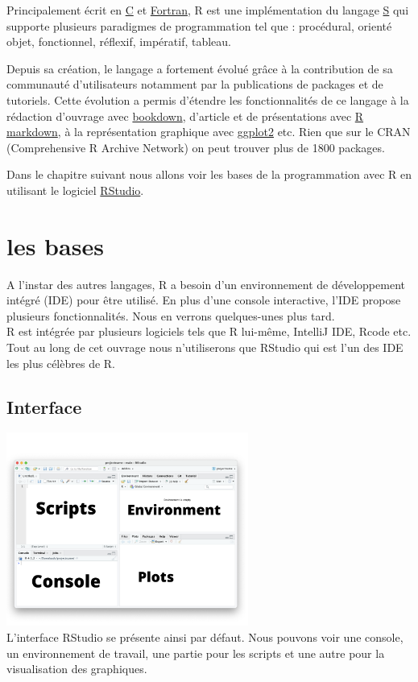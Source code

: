 \documentclass[
]{book}
\theoremstyle{definition}
\theoremstyle{definition}
\theoremstyle{definition}
\theoremstyle{definition}
\theoremstyle{remark}
\begin{document}
Principalement écrit en \href{https://en.wikipedia.org/wiki/C_(programming_language)}{C} et \href{https://en.wikipedia.org/wiki/Fortran}{Fortran}, R est une implémentation du langage \href{https://en.wikipedia.org/wiki/S_(programming_language)}{S} qui supporte plusieurs paradigmes de programmation tel que : procédural, orienté objet, fonctionnel, réflexif, impératif, tableau.

Depuis sa création, le langage a fortement évolué grâce à la contribution de sa communauté d'utilisateurs notamment par la publications de packages et de tutoriels. Cette évolution a permis d'étendre les fonctionnalités de ce langage à la rédaction d'ouvrage avec \href{https://bookdown.org/}{bookdown}, d'article et de présentations avec \href{https://rmarkdown.rstudio.com/}{R markdown}, à la représentation graphique avec \href{https://ggplot2.tidyverse.org/reference/geom_bar.html}{ggplot2} etc.
Rien que sur le CRAN (Comprehensive R Archive Network) on peut trouver plus de 1800 packages.

Dans le chapitre suivant nous allons voir les bases de la programmation avec R en utilisant le logiciel \href{https://www.rstudio.com/}{RStudio}.

\hypertarget{base}{%
\chapter{les bases}\label{base}}

A l'instar des autres langages, R a besoin d'un environnement de développement intégré (IDE) pour être utilisé. En plus d'une console interactive, l'IDE propose plusieurs fonctionnalités. Nous en verrons quelques-unes plus tard.\\
R est intégrée par plusieurs logiciels tels que R lui-même, IntelliJ IDE, Rcode etc. Tout au long de cet ouvrage nous n'utiliserons que RStudio qui est l'un des IDE les plus célèbres de R.

\hypertarget{interface}{%
\section{Interface}\label{interface}}

\includegraphics[width=3.125in,height=\textheight]{Console.png}\\
L'interface RStudio se présente ainsi par défaut. Nous pouvons voir une console, un environnement de travail, une partie pour les scripts et une autre pour la visualisation des graphiques.
\end{document}
